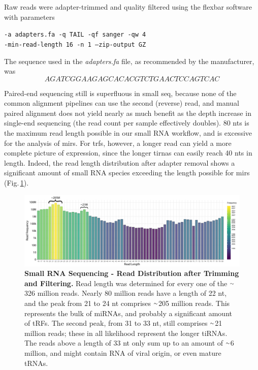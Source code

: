 \begin{method}

Raw reads were adapter-trimmed and quality filtered using the flexbar software\cite{Roehr2017} with parameters

\begin{center}\texttt{-a adapters.fa -q TAIL -qf sanger -qw 4 \\-min-read-length 16 -n 1 --zip-output GZ}\end{center} 

The sequence used in the \textit{adapters.fa} file, as recommended by the manufacturer, was $$AGATCGGAAGAGCACACGTCTGAACTCCAGTCAC$$ 

Paired-end sequencing still is superfluous in small \ac{seq}, because none of the common alignment pipelines can use the second (reverse) read, and manual paired alignment does not yield nearly as much benefit as the depth increase in single-end sequencing (the read count per sample effectively doubles). 80 \acp{nt} is the maximum read length possible in our small RNA workflow, and is excessive for the analysis of \acp{mir}. For \aclp{trf}, however, a longer read can yield a more complete picture of expression, since the longer \acp{tirna} can easily reach 40 \acp{nt} in length. Indeed, the read length distribution after adapter removal shows a significant amount of small RNA species exceeding the length possible for \acp{mir} (Fig.\,\ref{fig:read-dist-after-flexbar}).   

\end{method}

\begin{figure}
\centering
\includegraphics[width=\textwidth]{figures/read-dist-after-flexbar}
\caption[Small RNA Sequencing - Read Distribution after Trimming and Filtering.]{\textbf{Small RNA Sequencing - Read Distribution after Trimming and Filtering.} Read length was determined for every one of the $\smallsim$326 million reads. Nearly 80 million reads have a length of 22 nt, and the peak from 21 to 24 nt comprises $\smallsim$205 million reads. This represents the bulk of miRNAs, and probably a significant amount of tRFs. The second peak, from 31 to 33 nt, still comprises $\smallsim$21 million reads; these in all likelihood represent the longer tiRNAs. The reads above a length of 33 nt only sum up to an amount of $\smallsim$6 million, and might contain RNA of viral origin, or even mature tRNAs.
\label{fig:read-dist-after-flexbar}}
\end{figure}

